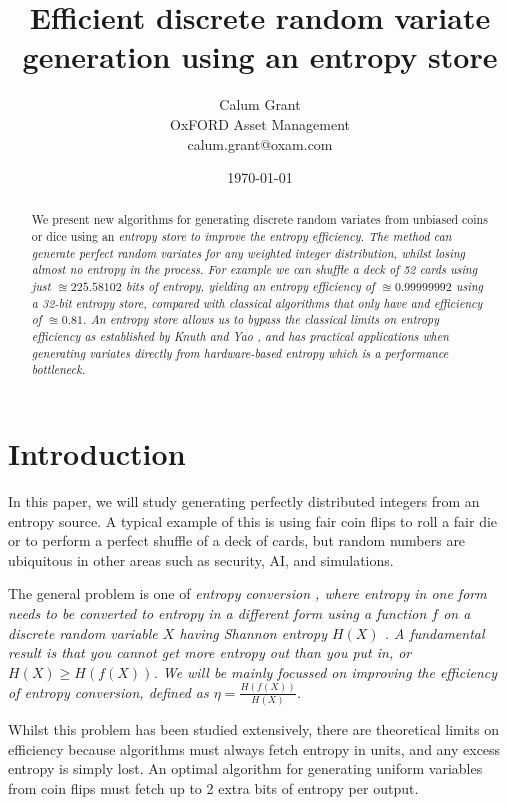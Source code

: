 \documentclass[12pt]{article}
\title{Efficient discrete random variate generation using an entropy store}
\author{Calum Grant \\
OxFORD Asset Management \\
calum.grant@oxam.com}
\date{\today}
\begin{document}
\maketitle

\begin{abstract}
    We present new algorithms for generating discrete random variates from unbiased coins or dice using an \em entropy store \em to improve the entropy efficiency. The method can generate perfect random variates for any weighted integer distribution, whilst losing almost no entropy in the process.  For example we can shuffle a deck of 52 cards using just $\approxeq 225.58102$ bits of entropy, yielding an entropy  efficiency of $\approxeq 0.99999992$ using a 32-bit entropy store, compared with classical algorithms that only have and efficiency of $\approxeq 0.81$. An entropy store allows us to bypass the classical limits on entropy efficiency as established by Knuth and Yao \cite{Knuth1976TheCO}, and has practical applications when generating variates directly from hardware-based entropy which is a performance bottleneck.    
\end{abstract}

\section{Introduction}

In this paper, we will study generating perfectly distributed integers from an entropy source. A typical example of this is using fair coin flips to roll a fair die or to perform a perfect shuffle of a deck of cards, but random numbers are ubiquitous in other areas such as security, AI, and simulations.

The general problem is one of \em entropy conversion \em, where entropy in one form needs to be converted to entropy in a different form using a function $f$ on a discrete random variable $X$ having Shannon entropy $H(X)$
\cite{shannon1948mathematical}.  
A fundamental result is that you cannot get more entropy out than you put in, or $H(X) \ge H(f(X))$. \cite{cover1999elements} 
We will be mainly focussed on improving the \em efficiency \em of entropy conversion, defined as $\eta = \frac{H(f(X))}{H(X)}$.

Whilst this problem has been studied extensively, there are theoretical limits on efficiency because algorithms must always fetch entropy in units, and any excess entropy is simply lost. An optimal algorithm for generating uniform variables from coin flips must fetch up to 2 extra bits of entropy per output.  \cite{cover1999elements, Knuth1976TheCO}
\end{document}
